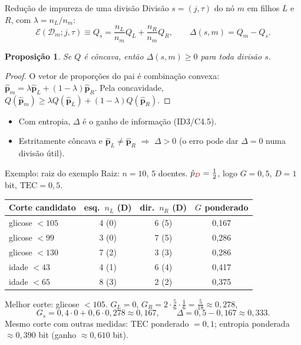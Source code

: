 \documentclass[aspectratio=169]{beamer}
\newtheorem{proposition}[theorem]{Proposição}
\newcommand{\Q}{Q}
\newcommand{\Err}{\mathcal E}
\newcommand{\TEC}{\mathrm{TEC}}
\newcommand{\cD}{\textcolor{red!70!black}{D}}  %
\begin{document}
\begin{frame}{Redução de impureza de uma divisão}
Divisão $s=(j,\tau)$ do nó $m$ em filhos $L$ e $R$, com $\lambda=n_L/n_m$:
\[
\Err(\mathcal D_m;j,\tau)\equiv\Q_s=\frac{n_L}{n_m}\Q_L+\frac{n_R}{n_m}\Q_R,\qquad
\Delta(s,m)=\Q_m-\Q_s .
\]
\begin{proposition}
Se $\Q$ é côncava, então $\Delta(s,m)\ge 0$ para toda divisão $s$.
\end{proposition}
\begin{proof}
O vetor de proporções do pai é combinação convexa: $\hat{\mathbf p}_m=\lambda\hat{\mathbf p}_L+(1-\lambda)\hat{\mathbf p}_R$. Pela concavidade, $\Q(\hat{\mathbf p}_m)\ge\lambda\Q(\hat{\mathbf p}_L)+(1-\lambda)\Q(\hat{\mathbf p}_R)$.
\end{proof}
\begin{itemize}
  \item Com entropia, $\Delta$ é o \alert{ganho de informação} (ID3/C4.5).
  \item Estritamente côncava e $\hat{\mathbf p}_L\ne\hat{\mathbf p}_R$ $\Rightarrow$ $\Delta>0$ (o erro pode dar $\Delta=0$ numa divisão útil).
\end{itemize}
\end{frame}

\begin{frame}{Exemplo: raiz do exemplo}
Raiz: $n=10$, $5$ doentes. $\hat p_{\cD}=\tfrac12$, logo $G=0{,}5$, $D=1$ bit, $\TEC=0{,}5$.

\vspace{4pt}
\centering
\small
\begin{tabular}{lccc}
\toprule
\textbf{Corte candidato} & \textbf{esq.\ $n_L$ (D)} & \textbf{dir.\ $n_R$ (D)} & \textbf{$G$ ponderado}\\
\midrule
glicose $<105$ & 4 (0) & 6 (5) & \alert{0,167}\\
glicose $<99$  & 3 (0) & 7 (5) & 0,286\\
glicose $<130$ & 7 (2) & 3 (3) & 0,286\\
idade $<43$    & 4 (1) & 6 (4) & 0,417\\
idade $<65$    & 8 (3) & 2 (2) & 0,375\\
\bottomrule
\end{tabular}

\vspace{6pt}
\raggedright
Melhor corte: glicose $<105$. $G_L=0$, $G_R=2\cdot\tfrac56\cdot\tfrac16=\tfrac{5}{18}\approx0{,}278$,
\[
G_s=0{,}4\cdot0+0{,}6\cdot0{,}278\approx0{,}167,\qquad \Delta=0{,}5-0{,}167\approx0{,}333 .
\]
{\footnotesize Mesmo corte com outras medidas: $\TEC$ ponderado $=0{,}1$; entropia ponderada $\approx0{,}390$ bit (ganho $\approx0{,}610$ bit).}
\end{frame}
\end{document}
